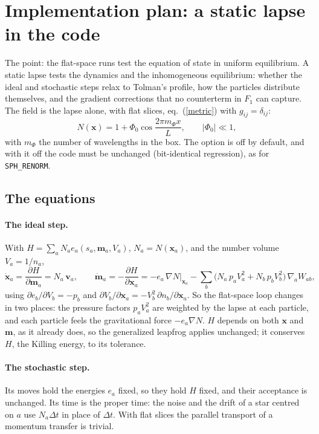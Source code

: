 \documentclass[11pt,aps,preprint,nofootinbib,superscriptaddress,tightenlines]{revtex4-2}
\def\st{\begin{equation}}
\def\stp{\end{equation}}
\def\Eq#1{eq.~(\ref{#1})}
\let\oldparagraph\paragraph
\renewcommand{\paragraph}{\par\bigskip\oldparagraph}
\begin{document}
\section{Implementation plan: a static lapse in the code}
\label{sec:implementation}

The point: the flat-space runs test the equation of state in uniform equilibrium.  A static lapse tests the dynamics and the inhomogeneous equilibrium: whether
the ideal and stochastic steps relax to Tolman's profile, how the particles distribute themselves, and the gradient corrections that no counterterm in $F_1$ can
capture.  The field is the lapse alone, with flat slices, \Eq{metric} with $g_{ij}=\delta_{ij}$:
\st
N(\bm x)=1+\Phi_0\cos\frac{2\pi m_\Phi x}{L},\qquad |\Phi_0|\ll1 ,
\stp
with $m_\Phi$ the number of wavelengths in the box.  The option is off by default, and with it off the code must be unchanged (bit-identical regression), as for
\texttt{SPH\_RENORM}.

\subsection{The equations}
\label{sec:impl_eqs}

\paragraph{The ideal step.}  With $H=\sum_aN_ae_a(s_a,\bm m_a,V_a)$, $N_a=N(\bm x_a)$, and the number volume $V_a=1/n_a$,
\st
\dot{\bm x}_a=\frac{\partial H}{\partial\bm m_a}=N_a\,\bm v_a,\qquad
\dot{\bm m}_a=-\frac{\partial H}{\partial\bm x_a}=-e_a\,\nabla N\big|_{\bm x_a}-\sum_b\big(N_a\,p_aV_a^2+N_b\,p_bV_b^2\big)\,\nabla_aW_{ab} ,
\label{lapseforce}
\stp
using $\partial e_b/\partial V_b=-p_b$ and $\partial V_b/\partial\bm x_a=-V_b^2\,\partial n_b/\partial\bm x_a$.  So the flat-space loop changes in two places: the pressure factors
$p_aV_a^2$ are weighted by the lapse at each particle, and each particle feels the gravitational force $-e_a\nabla N$.  $H$ depends on both $\bm x$ and $\bm m$, as it
already does, so the generalized leapfrog applies unchanged; it conserves $H$, the Killing energy, to its tolerance.

\paragraph{The stochastic step.}  Its moves hold the energies $e_a$ fixed, so they hold $H$ fixed, and their acceptance is unchanged.  Its time is the proper time: the
noise and the drift of a star centred on $a$ use $N_a\Delta t$ in place of $\Delta t$.  With flat slices the parallel transport of a momentum transfer is trivial.
\end{document}
